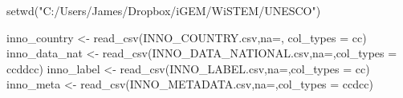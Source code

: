 \documentclass[
]{article}
\newenvironment{Shaded}{\begin{snugshade}}{\end{snugshade}}
\newcommand{\AttributeTok}[1]{\textcolor[rgb]{0.77,0.63,0.00}{#1}}
\newcommand{\FunctionTok}[1]{\textcolor[rgb]{0.00,0.00,0.00}{#1}}
\newcommand{\NormalTok}[1]{#1}
\newcommand{\OtherTok}[1]{\textcolor[rgb]{0.56,0.35,0.01}{#1}}
\newcommand{\StringTok}[1]{\textcolor[rgb]{0.31,0.60,0.02}{#1}}
\begin{document}
\begin{Shaded}
\begin{Highlighting}[]
\FunctionTok{setwd}\NormalTok{(}\StringTok{"C:/Users/James/Dropbox/iGEM/WiSTEM/UNESCO"}\NormalTok{)}


\NormalTok{inno\_country }\OtherTok{\textless{}{-}} \FunctionTok{read\_csv}\NormalTok{(}\StringTok{\textquotesingle{}INNO\_COUNTRY.csv\textquotesingle{}}\NormalTok{,}\AttributeTok{na=}\StringTok{\textquotesingle{}\textquotesingle{}}\NormalTok{, }\AttributeTok{col\_types =} \StringTok{\textquotesingle{}cc\textquotesingle{}}\NormalTok{)}
\NormalTok{inno\_data\_nat }\OtherTok{\textless{}{-}} \FunctionTok{read\_csv}\NormalTok{(}\StringTok{\textquotesingle{}INNO\_DATA\_NATIONAL.csv\textquotesingle{}}\NormalTok{,}\AttributeTok{na=}\StringTok{\textquotesingle{}\textquotesingle{}}\NormalTok{,}\AttributeTok{col\_types =} \StringTok{\textquotesingle{}ccddcc\textquotesingle{}}\NormalTok{)}
\NormalTok{inno\_label }\OtherTok{\textless{}{-}} \FunctionTok{read\_csv}\NormalTok{(}\StringTok{\textquotesingle{}INNO\_LABEL.csv\textquotesingle{}}\NormalTok{,}\AttributeTok{na=}\StringTok{\textquotesingle{}\textquotesingle{}}\NormalTok{,}\AttributeTok{col\_types =} \StringTok{\textquotesingle{}cc\textquotesingle{}}\NormalTok{)}
\NormalTok{inno\_meta }\OtherTok{\textless{}{-}} \FunctionTok{read\_csv}\NormalTok{(}\StringTok{\textquotesingle{}INNO\_METADATA.csv\textquotesingle{}}\NormalTok{,}\AttributeTok{na=}\StringTok{\textquotesingle{}\textquotesingle{}}\NormalTok{,}\AttributeTok{col\_types =} \StringTok{\textquotesingle{}ccdcc\textquotesingle{}}\NormalTok{)}


\end{Highlighting}
\end{Shaded}
\end{document}
